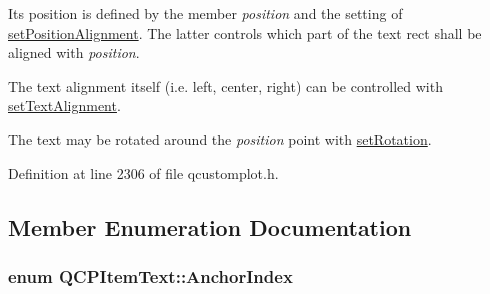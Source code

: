  Its position is defined by the member {\itshape position} and the setting of \hyperlink{class_q_c_p_item_text_a781cdf8c640fc6a055dcff1e675c8c7a}{set\-Position\-Alignment}. The latter controls which part of the text rect shall be aligned with {\itshape position}.

The text alignment itself (i.\-e. left, center, right) can be controlled with \hyperlink{class_q_c_p_item_text_ab5bc0684c4d1bed81949a11b34dba478}{set\-Text\-Alignment}.

The text may be rotated around the {\itshape position} point with \hyperlink{class_q_c_p_item_text_a4bcc10cd97952c3f749d75824b5077f0}{set\-Rotation}. 

Definition at line 2306 of file qcustomplot.\-h.



\subsection{Member Enumeration Documentation}
\hypertarget{class_q_c_p_item_text_a14a84e58f72519c8ae1d7a4a1dd23f21}{
\subsubsection[{Anchor\-Index}]{\setlength{\rightskip}{0pt plus 5cm}enum {\bf Q\-C\-P\-Item\-Text\-::\-Anchor\-Index}\hspace{0.3cm}{\ttfamily [protected]}}}\label{class_q_c_p_item_text_a14a84e58f72519c8ae1d7a4a1dd23f21}
